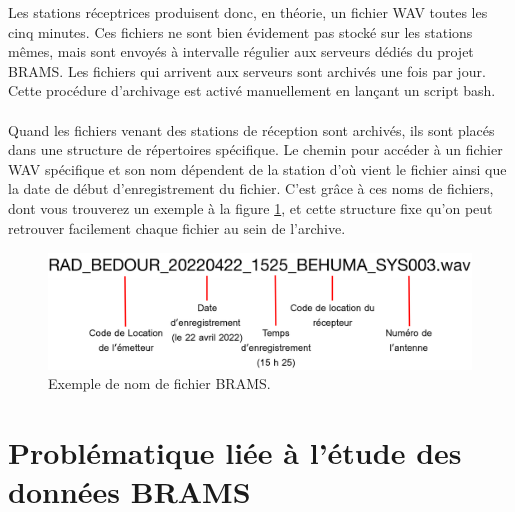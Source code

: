 \documentclass[11pt]{article}
\begin{document}
Les stations réceptrices produisent donc, en théorie, un fichier WAV toutes les cinq minutes.
Ces fichiers ne sont bien évidement pas stocké sur les stations mêmes, mais sont envoyés à intervalle régulier aux serveurs dédiés du projet BRAMS.
Les fichiers qui arrivent aux serveurs sont archivés une fois par jour.
Cette procédure d'archivage est activé manuellement en lançant un script bash.\\
\\
Quand les fichiers venant des stations de réception sont archivés, ils sont placés dans une structure de répertoires spécifique.
Le chemin pour accéder à un fichier WAV spécifique et son nom dépendent de la station d'où vient le fichier ainsi que la date de début d'enregistrement du fichier.
C'est grâce à ces noms de fichiers, dont vous trouverez un exemple à la figure \ref{fig:file_name_brams}, et cette structure fixe qu'on peut retrouver facilement chaque fichier au sein de l'archive.\\

\begin{figure}[t]
    \begin{center}
        \includegraphics[scale=0.15]{file_name.png}
        \caption{Exemple de nom de fichier BRAMS.}
        \label{fig:file_name_brams}
    \end{center}
\end{figure}

\newpage

\section{Problématique liée à l'étude des données BRAMS}
\end{document}
